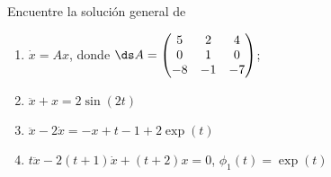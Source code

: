 \documentclass{homework}
\begin{document}
\begin{prob}
    Encuentre la solución general de
    \begin{enumerate}[label=(\alph*)]
        \item \(\dot{x}=Ax\), donde \(\ds A=\begin{pmatrix}
            5&2&4\\0&1&0\\-8&-1&-7
        \end{pmatrix}\);
        \item \(\ddot{x}+x=2\sin(2t)\)
        \item \(\ddot{x}-2\dot{x}=-x+t-1+2\exp(t)\)
        \item \(t\ddot{x}-2(t+1)\dot{x}+(t+2)x=0\), \(\phi_1(t)=\exp(t)\)
    \end{enumerate}
\end{prob}
\end{document}
